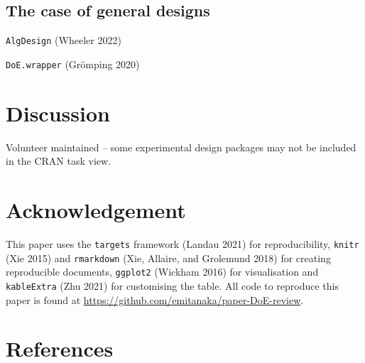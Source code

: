 \documentclass{article}
\begin{document}
\hypertarget{the-case-of-general-designs}{%
\subsection{The case of general
designs}\label{the-case-of-general-designs}}

\texttt{AlgDesign} (Wheeler 2022)

\texttt{DoE.wrapper} (Grömping 2020)

\hypertarget{discussion}{%
\section{Discussion}\label{discussion}}

Volunteer maintained -- some experimental design packages may not be
included in the CRAN task view.

\hypertarget{acknowledgement}{%
\section{Acknowledgement}\label{acknowledgement}}

This paper uses the \texttt{targets} framework (Landau 2021) for
reproducibility, \texttt{knitr} (Xie 2015) and \texttt{rmarkdown} (Xie,
Allaire, and Grolemund 2018) for creating reproducible documents,
\texttt{ggplot2} (Wickham 2016) for visualisation and
\texttt{kableExtra} (Zhu 2021) for customising the table. All code to
reproduce this paper is found at
\url{https://github.com/emitanaka/paper-DoE-review}.

\hypertarget{references}{%
\section*{References}\label{references}}
\end{document}
